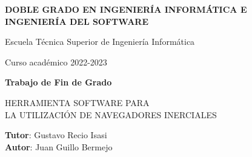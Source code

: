 \thispagestyle{empty}
\vspace{2cm}

\begin{figure}[htb]
  \centerline{}
\end{figure}

\begin{center}
  {\Large {\bf DOBLE GRADO EN INGENIERÍA INFORMÁTICA E INGENIERÍA DEL SOFTWARE}}
  \vspace{5mm}
 
  {\large {Escuela Técnica Superior de Ingeniería Informática}}
  \vspace{5mm}

  {\large {Curso académico 2022-2023}}

  \vspace{1cm}

  {\large {\bf Trabajo de Fin de Grado}}

  \vspace{2cm}

  {\Large {HERRAMIENTA SOFTWARE PARA \\
  LA UTILIZACIÓN DE NAVEGADORES INERCIALES\\[1cm] }}

  \vspace{5cm}
  {\bf Tutor}: Gustavo Recio Isasi \\
  {\bf Autor}: Juan Guillo Bermejo
\end{center}

\clearpage
\thispagestyle{empty}
